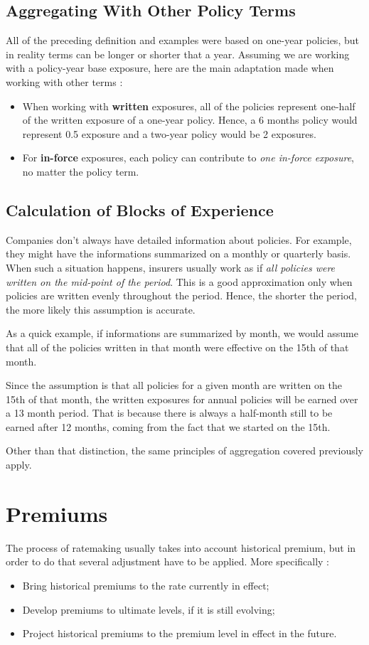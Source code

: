 \documentclass[11pt, english]{memoir}
\numberwithin{definition}{section}
\begin{document}
	\section{Aggregating With Other Policy Terms}
	All of the preceding definition and examples were based on one-year policies, but in reality terms can be longer or shorter that a year. Assuming we are working with a policy-year base exposure, here are the main adaptation made when working with other terms : 
	\begin{itemize}
		\item When working with \textbf{written} exposures, all of the policies represent one-half of the written exposure of a one-year policy. Hence, a 6 months policy would represent 0.5 exposure and a two-year policy would be 2 exposures. \\
		\item For \textbf{in-force} exposures, each policy can contribute to \emph{one in-force exposure}, no matter the policy term. 
	\end{itemize}
	
	\section{Calculation of Blocks of Experience}
	Companies don't always have detailed information about policies. For example, they might have the informations summarized on a monthly or quarterly basis. When such a situation happens, insurers usually work as if \emph{all policies were written on the mid-point of the period}. This is a good approximation only when policies are written evenly throughout the period. Hence, the shorter the period, the more likely this assumption is accurate. 
	
	As a quick example, if informations are summarized by month, we would assume that all of the policies written in that month were effective on the 15th of that month. 
	
	Since the assumption is that all policies for a given month are written on the 15th of that month, the written exposures for annual policies will be earned over a 13 month period. That is because there is always a half-month still to be earned after 12 months, coming from the fact that we started on the 15th.
	
	Other than that distinction, the same principles of aggregation covered previously apply.
	
	
	
	
	\chapter{Premiums}
	The process of ratemaking usually takes into account historical premium, but in order to do that several adjustment have to be applied. More specifically : 
	\begin{itemize}
		\item Bring historical premiums to the rate currently in effect;
		\item Develop premiums to ultimate levels, if it is still evolving; 
		\item Project historical premiums to the premium level in effect in the future. 
	\end{itemize}
	
\end{document}
